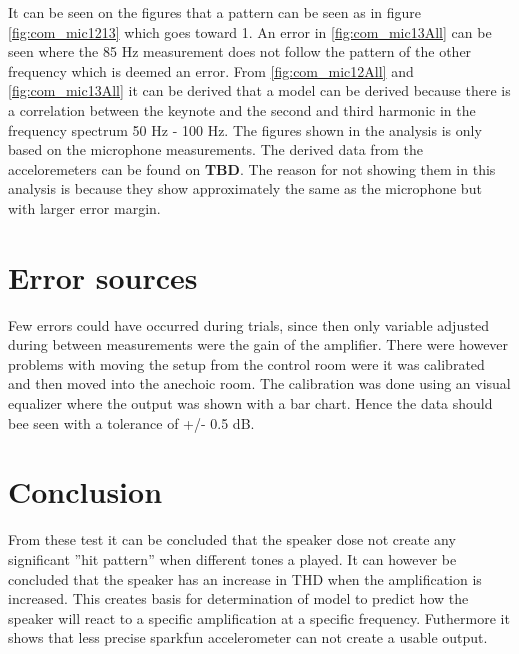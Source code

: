 It can be seen on the figures that a pattern can be seen as in figure \autoref{fig:com_mic1213} which goes toward 1. An error in \autoref{fig:com_mic13All} can be seen where the 85 Hz measurement does not follow the pattern of the other frequency which is deemed an error. From \autoref{fig:com_mic12All} and \autoref{fig:com_mic13All} it can be derived that a model can be derived because there is a correlation between the keynote and the second and third harmonic in the frequency spectrum 50 Hz - 100 Hz. The figures shown in the analysis is only based on the microphone measurements. The derived data from the acceloremeters can be found on \textbf{TBD}. The reason for not showing them in this analysis is because they show approximately the same as the microphone but with larger error margin. 


\section{Error sources}
Few errors could have occurred during trials, since then only variable adjusted during between measurements were the gain of the amplifier. There were however problems with moving the setup from the control room were it was calibrated and then moved into the anechoic room. The
calibration was done using an visual equalizer where the output was shown with a bar chart. Hence the data should bee seen with a tolerance of +/- 0.5 dB.

\section{Conclusion}

From these test it can be concluded that the speaker dose not create any significant ''hit pattern'' when different tones a played. It can however be concluded that the speaker has an increase in THD when the amplification is increased. This creates basis for determination of model to predict how the speaker will react to a specific amplification at a specific frequency.  Futhermore it shows that less precise sparkfun accelerometer can not create a usable output. 